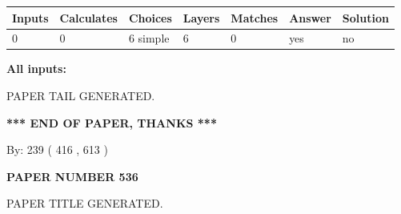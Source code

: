 \documentclass[12pt]{article}
\begin{document}
   
\noindent\begin{tabular}{|l|l|l|l|l|l|l|}
 \hline
Inputs & Calculates & Choices & Layers & Matches & Answer & Solution \\ \hline
 0  & 
 0  & 
 6
  simple  
  & 
 6  & 
 0  & 
  yes & 
  no 
  \\ \hline
 \end{tabular}
   
   
   
   
\noindent{}
   
   
   
   
\noindent\vspace{0.1in}\hspace{-0.08in} {\textbf{\Large{All inputs: }}}
   
   
   
   
   
   
 \vspace{0.2in}
 
   
   
\vspace{2.0in} PAPER TAIL GENERATED.
   
   
   
   
\vspace{1.0in} 
{\textbf{\large{ *** END OF PAPER, THANKS *** }}} 
   
   
\hspace{1.0in} By: 
 239 ( 416 ,  613 )
   
   
   
   
\newpage 
\setcounter{page}{ 
   536001 } 
   
   
   
   
 {\textbf{ \Large{ PAPER NUMBER  536  }}}
   
   
\vspace{0.2in}
   
   
   
   
   
   
   
   
 \vspace{0.2in}
 
 
 
 
   
   
 PAPER TITLE GENERATED.
   
   
   
\vspace{0.2in}
   
\end{document}
